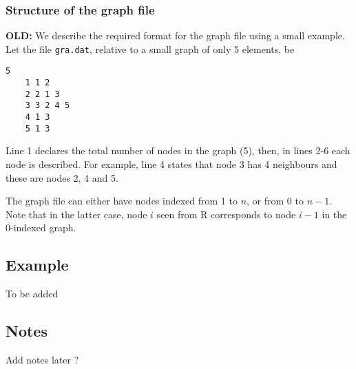 \documentclass[a4paper,11pt]{article}
\begin{document}
\subsubsection*{Structure of the graph file}

\textbf{OLD:}
We describe the required format for the graph file using a small
example. Let the file {\tt gra.dat}, relative to a small graph of only
5 elements, be
\begin{lstlisting}[basicstyle=\footnotesize]
    5
    1 1 2
    2 2 1 3
    3 3 2 4 5 
    4 1 3
    5 1 3
\end{lstlisting}
Line 1 declares the total number of nodes in the graph (5), then, in
lines 2-6 each node is described. For example, line 4 states that node
3 has 4 neighbours and these are nodes 2, 4 and 5.

The graph file can either have nodes indexed from 1 to $n$, or from 0
to $n-1$. Note that in the latter case, node $i$ seen from R
corresponds to node $i-1$ in the 0-indexed graph.



\subsection*{Example}

To be added

\subsection*{Notes}

Add notes later ? 
\end{document}
